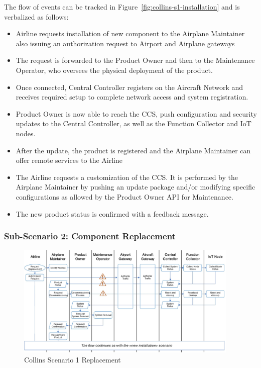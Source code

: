 The flow of events can be tracked in Figure~\ref{fig:collins-s1-installation} and is verbalized as follows:

\begin{itemize}
	\item Airline requests installation of new component to the Airplane Maintainer also issuing an authorization
	      request to Airport and Airplane gateways
	\item The request is forwarded to the Product Owner and then to the Maintenance Operator, who oversees the
	      physical deployment of the product.
	\item Once connected, Central Controller registers on the Aircraft Network and receives required setup to
	      complete network access and system registration.
	\item Product Owner is now able to reach the CCS, push configuration and security updates to the Central
	      Controller, as well as the Function Collector and IoT nodes.
	\item After the update, the product is registered and the Airplane Maintainer can offer remote services to the
	      Airline
	\item The Airline requests a customization of the CCS. It is performed by the Airplane Maintainer by pushing an
	      update package and/or modifying specific configurations as allowed by the Product Owner API for
	      Maintenance.
	\item The new product status is confirmed with a feedback message.
\end{itemize}

\subsubsection{Sub-Scenario 2: Component Replacement}

\begin{figure}
	\begin{center}
		\includegraphics[width=0.95\textwidth]{figures/collins-s1-replacement.jpg}
	\end{center}
	\caption{Collins Scenario 1 Replacement}
	\label{fig:collins-s1-replacement}
\end{figure}


